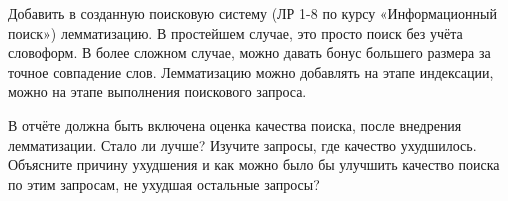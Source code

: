 
Добавить в созданную поисковую систему (ЛР 1-8 по курсу «Информационный поиск»)
лемматизацию. В простейшем случае, это просто поиск без учёта словоформ. В более сложном
случае, можно давать бонус большего размера за точное совпадение слов. Лемматизацию можно
добавлять на этапе индексации, можно на этапе выполнения поискового запроса.

В отчёте должна быть включена оценка качества поиска, после внедрения лемматизации. Стало
ли лучше? Изучите запросы, где качество ухудшилось. Объясните причину ухудшения и как можно
было бы улучшить качество поиска по этим запросам, не ухудшая остальные запросы?

\pagebreak
